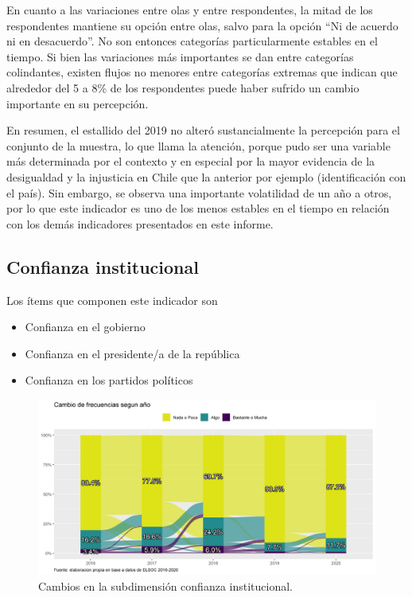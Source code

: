 \documentclass[
  12pt,
]{book}
\begin{document}
En cuanto a las variaciones entre olas y entre respondentes, la mitad de los respondentes mantiene su opción entre olas, salvo para la opción ``Ni de acuerdo ni en desacuerdo''. No son entonces categorías particularmente estables en el tiempo. Si bien las variaciones más importantes se dan entre categorías colindantes, existen flujos no menores entre categorías extremas que indican que alrededor del 5 a 8\% de los respondentes puede haber sufrido un cambio importante en su percepción.

En resumen, el estallido del 2019 no alteró sustancialmente la percepción para el conjunto de la muestra, lo que llama la atención, porque pudo ser una variable más determinada por el contexto y en especial por la mayor evidencia de la desigualdad y la injusticia en Chile que la anterior por ejemplo (identificación con el país). Sin embargo, se observa una importante volatilidad de un año a otros, por lo que este indicador es uno de los menos estables en el tiempo en relación con los demás indicadores presentados en este informe.

\hypertarget{confianza-institucional}{%
\subsection{Confianza institucional}\label{confianza-institucional}}

Los ítems que componen este indicador son

\begin{itemize}
\item
  Confianza en el gobierno
\item
  Confianza en el presidente/a de la república
\item
  Confianza en los partidos políticos
\end{itemize}

\begin{figure}[H]

{\centering \includegraphics[width=1\linewidth,height=1\textheight]{output/graphs/alluvial_conf_institucional} 

}

\caption{Cambios en la subdimensión confianza institucional.}\label{fig:alluvial-conf-institucional}
\end{figure}
\end{document}
